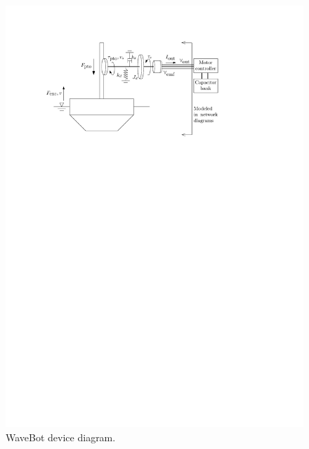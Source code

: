 \documentclass[lettersize,journal]{IEEEtran}
\begin{document}
\begin{figure}[tb]
        \centering
        \includegraphics[width=1\columnwidth]{wec_as_multiport_phyiscal_diagram.pdf}
        \caption{WaveBot device diagram.}
        \label{fig:wec_as_multiport_phyiscal_diagram}
\end{figure}
\end{document}
